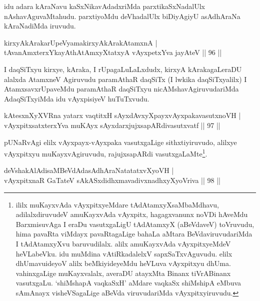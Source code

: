 \begin{artha}
idu adara kAraNavu kaSxNikavAdadxriMda parxtikaSxNadalUlx nAshavAguvaMtahudu. parxtiyoMdu deVhadalUlx biDiyAgiyU asAdhAraNa kAraNadiMda iruvudu.
\end{artha}%

\begin{shl}
kirxyAkArakarUpeVyamakirxyA\s kArakAtamxnA |\\
tAvanAmxterxYkayAthAtAmxyXtatxyA vAyxpetxYva jayAteV \hfill || 96 ||
\end{shl}

\begin{artha}
I daqSiTxyu kirxye, kAraka, I rUpagaLuLaLxdudx, kirxyA kArakagaLeraDU alalxda AtamxneV Agiruvudu paramAthaR daqSiTx (I lwkika daqSiTxyalilx) I AtamxsavxrUpaveMdu paramAthaR daqSiTxyu nicAMshavAgiruvudariMda AdaqSiTxyiMda idu vAyxpisiyeV huTuTxvudu.
\end{artha}


\begin{shl}
kAtesxnXyXVRna yatarx vaqtitxH sAyxdAvxyXpayxvAyxpakavasutxnoVH |\\
vAyxpitxsatxterxYva muKAyx sAyxdarxjujxsapARdivasutxvatf \hfill || 97 ||
\end{shl}

\begin{artha}
pUNaRvAgi elilx vAyxpayx-vAyxpaka vasutxgaLige sithxtiyiruvudo, alilxye vAyxpitxyu muKayxvAgiruvudu, rajujxsapARdi vasutxgaLaMte\footnote{ililx muKayxvAda vAyxpitxyeMdare tAdAtamxyXsaMbaMdhavu, adilalxdiruvudeV amuKayxvAda vAyxpitx, hagagxvanunx noVDi hAveMdu BarxmisuvAga I eraDu vasutxgaLigU tAdAtamxyX (aBeVdaveV) toVruvudu, hima pavaRta viMdayx pavaRtagaLige bahaLa aMtara BeVdaviruvudariMda I tAdAtamxyXvu baruvudilalx. alilx amuKayxvAda vAyxpitxyeMdeV heVLabeVku. idu muMdina vAtiRkadalelxV sapxSaTxvAguvudu. elilx dhUmavuideyoV alilx beMkiyideyeMdu heVLuva vAyxpitxyu dhUma. vahinxgaLige muKayxvalalx, averaDU atayxMta Binanx tiVrABinanx vasutxgaLu. `shiMshapA vaqkaSxH' aMdare vaqkaSx shiMshipA eMbuva sAmAnayx visheVSagaLige aBeVda viruvudariMda vAyxpitxyiruvudu.}.
\end{artha}


\begin{shl}
deVshakAlAdisaMBeVdAdasAdhAraNatatatxvXyoVH |\\
vAyxpitxnaR GaTateV sAkASxdidhxmavadivxnadhxyXyoVriva \hfill || 98 ||
\end{shl}

